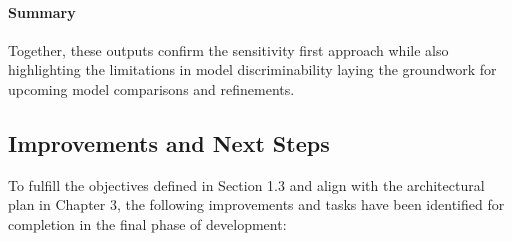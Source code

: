 \documentclass[12pt]{article}
\begin{document}
\paragraph {Summary} Together, these outputs confirm the sensitivity first approach while also highlighting the limitations in model discriminability laying the groundwork for upcoming model comparisons and refinements.

\subsection{Improvements and Next Steps}
To fulfill the objectives defined in Section 1.3 and align with the architectural plan in Chapter 3, the following improvements and tasks have been identified for completion in the final phase of development:
\end{document}
